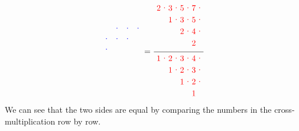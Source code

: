 \documentclass[a4paper,11pt]{amsart}
\begin{document}
\[{\begin{tikzpicture}[blue,yscale=-0.45, xscale=0.45]
					\node at (2,2.5) {$\cdot$};
					\node at (3,2.5) {$\cdot$};
					\node at (4,2.5) {$\cdot$};
					\node at (1,3.5) {$\cdot$};
					\node at (2,3.5) {$\cdot$};
					\node at (3,3.5) {$\cdot$};
					\node at (1,4.5) {$\cdot$};
				\end{tikzpicture}\hfill
			}
			=\dfrac{%
				\begin{tikzpicture}[red,xscale = 0.5, yscale=-0.5]
					\draw (0.5,0.5)  node{$2$};
					\draw (1.5,0.5)  node{$3$};
					\draw (2.5,0.5)  node{$5$};
					\draw (3.5,0.5)  node{$7$};
					\draw (1.5,1.5)  node{$1$};
					\draw (2.5,1.5)  node{$3$};
					\draw (3.5,1.5)  node{$5$};
					\draw (2.5,2.5)  node{$2$};
					\draw (3.5,2.5)  node{$4$};
					\draw (3.5,3.5)  node{$2$};
					\node at (1,0.5) {$\cdot$};
					\node at (2,0.5) {$\cdot$};
					\node at (3,0.5) {$\cdot$};
					\node at (4,0.5) {$\cdot$};
					\node at (2,1.5) {$\cdot$};
					\node at (3,1.5) {$\cdot$};
					\node at (4,1.5) {$\cdot$};
					\node at (3,2.5) {$\cdot$};
					\node at (4,2.5) {$\cdot$};
				\end{tikzpicture}\hfill
			}
			{%
				\begin{tikzpicture}[red, xscale = 0.5, yscale=-0.5]
					\draw (0.5,0.5)  node{$1$};
					\draw (1.5,0.5)  node{$2$};
					\draw (2.5,0.5)  node{$3$};
					\draw (3.5,0.5)  node{$4$};
					\draw (1.5,1.5)  node{$1$};
					\draw (2.5,1.5)  node{$2$};
					\draw (3.5,1.5)  node{$3$};
					\draw (2.5,2.5)  node{$1$};
					\draw (3.5,2.5)  node{$2$};
					\draw (3.5,3.5)  node{$1$};
					\node at (1,0.5) {$\cdot$};
					\node at (2,0.5) {$\cdot$};
					\node at (3,0.5) {$\cdot$};
					\node at (4,0.5) {$\cdot$};
					\node at (2,1.5) {$\cdot$};
					\node at (3,1.5) {$\cdot$};
					\node at (4,1.5) {$\cdot$};
					\node at (3,2.5) {$\cdot$};
					\node at (4,2.5) {$\cdot$};
				\end{tikzpicture}\hfill
			}\]
			We can see that the two sides are equal by comparing the numbers in the cross-multiplication row by row.
\end{document}
